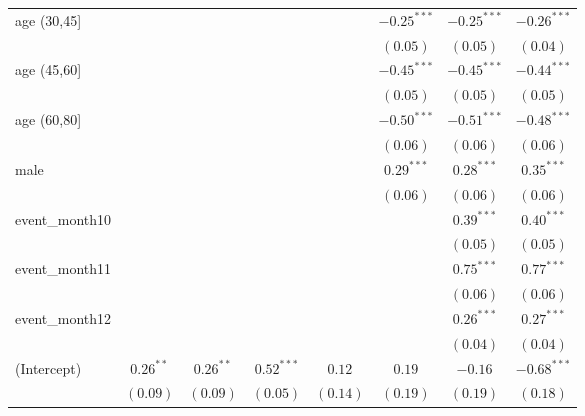 \begin{table}
\begin{center}
\begin{tabular}{l c c c c c c c}
age (30,45]    &              &              &              &              & $-0.25^{***}$ & $-0.25^{***}$ & $-0.26^{***}$ \\
               &              &              &              &              & $(0.05)$      & $(0.05)$      & $(0.04)$      \\
age (45,60]    &              &              &              &              & $-0.45^{***}$ & $-0.45^{***}$ & $-0.44^{***}$ \\
               &              &              &              &              & $(0.05)$      & $(0.05)$      & $(0.05)$      \\
age (60,80]    &              &              &              &              & $-0.50^{***}$ & $-0.51^{***}$ & $-0.48^{***}$ \\
               &              &              &              &              & $(0.06)$      & $(0.06)$      & $(0.06)$      \\
male           &              &              &              &              & $0.29^{***}$  & $0.28^{***}$  & $0.35^{***}$  \\
               &              &              &              &              & $(0.06)$      & $(0.06)$      & $(0.06)$      \\
event\_month10 &              &              &              &              &               & $0.39^{***}$  & $0.40^{***}$  \\
               &              &              &              &              &               & $(0.05)$      & $(0.05)$      \\
event\_month11 &              &              &              &              &               & $0.75^{***}$  & $0.77^{***}$  \\
               &              &              &              &              &               & $(0.06)$      & $(0.06)$      \\
event\_month12 &              &              &              &              &               & $0.26^{***}$  & $0.27^{***}$  \\
               &              &              &              &              &               & $(0.04)$      & $(0.04)$      \\
(Intercept)    & $0.26^{**}$  & $0.26^{**}$  & $0.52^{***}$ & $0.12$       & $0.19$        & $-0.16$       & $-0.68^{***}$ \\
               & $(0.09)$     & $(0.09)$     & $(0.05)$     & $(0.14)$     & $(0.19)$      & $(0.19)$      & $(0.18)$      \\

\end{tabular}
\end{center}
\end{table}
